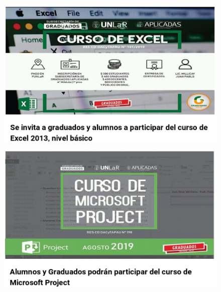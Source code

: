 \documentclass{fancyslides}
\begin{document}
\begin{frame}
\begin{figure}
	\centering
	\includegraphics[width=1\linewidth]{images/excel}
	\label{fig:excel}
\end{figure}

\end{frame}

\begin{frame}
\begin{figure}
	\centering
	\includegraphics[width=1\linewidth]{images/msproject}
	\label{fig:msproject}
\end{figure}
\end{frame}
\end{document}
